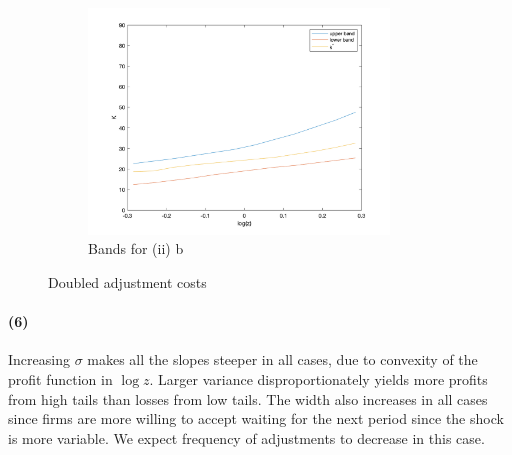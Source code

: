 \documentclass[10pt,letter]{article}
\newcommand{\problempart}[1]{\paragraph{#1}}
\begin{document}
\begin{center}
\begin{figure}
\begin{subfigure}{.5\textwidth}
\includegraphics[width=8cm]{ps3q2_fig12}
\caption{Bands for (ii) b}
\end{subfigure}
\caption{Doubled adjustment costs}
\end{figure}
\end{center}
\problempart{(6)} Increasing $\sigma$ makes all the slopes steeper in all cases, due to convexity of the profit function in $\log z$. Larger variance disproportionately yields more profits from high tails than losses from low tails. The width also increases in all cases since firms are more willing to accept waiting for the next period since the shock is more variable. We expect frequency of adjustments to decrease in this case.
\end{document}
